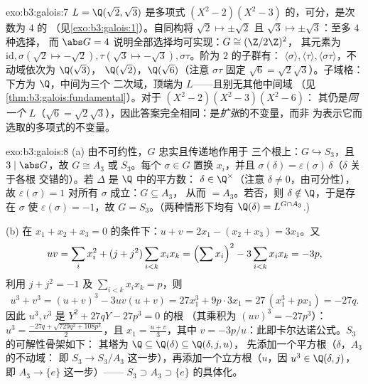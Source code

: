\begin{solution}{exo:b3:galois:7}
$L = \Q(\sqrt2, \sqrt3)$ 是多项式 $(X^2 -
2)(X^2 - 3)$ 的，可分，是次数为 $4$ 的
（见\cref{exo:b3:galois:1}）。自同构将 $\sqrt2 \mapsto
\pm\sqrt2$ 且 $\sqrt3 \mapsto \pm\sqrt3$：至多 $4$ 种选择，
而 $\abs G = 4$ 说明全部选择均可实现：$G \cong (\Z/2\Z)^2$，
其元素为 $\mathrm{id}, \sigma (\sqrt2 \mapsto -\sqrt2), \tau
(\sqrt3\mapsto-\sqrt3), \sigma\tau$。阶为 $2$ 的子群有：
$\langle\sigma\rangle, \langle\tau\rangle,
\langle\sigma\tau\rangle$，不动域依次为 $\Q(\sqrt3)$，
$\Q(\sqrt2)$，$\Q(\sqrt6)$（注意 $\sigma\tau$ 固定 $\sqrt6 =
\sqrt2\sqrt3$）。子域格：下方为 $\Q$，中间为三个
二次域，顶端为 $L$——且别无其他中间域
（见\cref{thm:b3:galois:fundamental}）。对于 $(X^2-2)(X^2-3)(X^2-6)$：
其仍是\emph{同一个} $L$（$\sqrt6 =
\sqrt2\sqrt3$），因此答案完全相同：是\emph{扩张}的不变量，而非
为表示它而选取的多项式的不变量。
\end{solution}

\begin{solution}{exo:b3:galois:8}
(a) 由不可约性，$G$ 忠实且传递地作用于
三个根上：$G \hookrightarrow S_3$，且 $3 \mid \abs G$，故 $G
\cong A_3$ 或 $S_3$。每个 $\sigma \in G$ 置换 $x_i$，并且
$\sigma(\delta) = \varepsilon(\sigma)\,\delta$（$\delta$ 关于各根
交错的）。若 $\Delta$ 是 $\Q$ 中的平方数：
$\delta \in \Q^\times$（注意 $\delta \neq 0$，由可分性），故
$\varepsilon(\sigma) = 1$ 对所有 $\sigma$ 成立：$G \subseteq A_3$，
从而 $= A_3$。若否，则 $\delta \notin \Q$，于是存在 $\sigma$ 使
$\varepsilon(\sigma) = -1$，故 $G = S_3$。（两种情形下均有 $\Q(\delta)
= L^{G \cap A_3}$.)

(b) 在 $x_1 + x_2 + x_3 = 0$ 的条件下：$u + v = 2x_1 - (x_2 + x_3) =
3x_1$。又
\[
uv = \sum_i x_i^2 + (j + j^2)\sum_{i<k}x_ix_k
= \Bigl(\sum x_i\Bigr)^2 - 3\sum_{i<k}x_ix_k = -3p,
\]
利用 $j + j^2 = -1$ 及 $\sum_{i<k}x_ix_k = p$，则
\[
u^3 + v^3 = (u+v)^3 - 3uv(u+v) = 27x_1^3 + 9p\cdot 3x_1
= 27\,(x_1^3 + px_1) = -27q .
\]
因此 $u^3, v^3$ 是 $Y^2 + 27qY - 27p^3 = 0$ 的根
（其乘积为 $(uv)^3 = -27p^3$）：$u^3 = \frac{-27q +
\sqrt{729q^2 + 108p^3}}2$，且 $x_1 = \frac{u + v}3$，其中 $v =
-3p/u$：此即卡尔达诺公式。$S_3$ 的可解性骨架如下：
其塔为 $\Q \subseteq \Q(\delta) \subseteq \Q(\delta, j, u)$，
先添加一个平方根（$\delta$，$A_3$ 的不动域：
即 $S_3 \to S_3/A_3$ 这一步），再添加一个立方根（$u$，因 $u^3
\in \Q(\delta, j)$，即 $A_3 \to \{e\}$ 这一步）—— $S_3 \supset A_3 \supset \{e\}$ 的具体化。
\end{solution}

